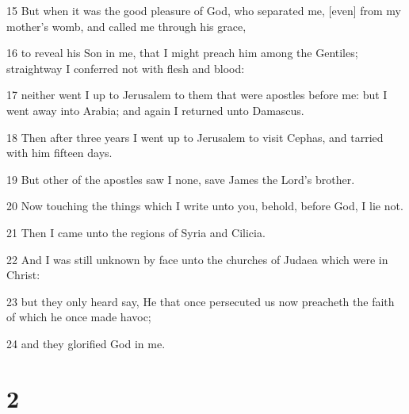 \par 15 But when it was the good pleasure of God, who separated me, [even] from my mother's womb, and called me through his grace,
\par 16 to reveal his Son in me, that I might preach him among the Gentiles; straightway I conferred not with flesh and blood:
\par 17 neither went I up to Jerusalem to them that were apostles before me: but I went away into Arabia; and again I returned unto Damascus.
\par 18 Then after three years I went up to Jerusalem to visit Cephas, and tarried with him fifteen days.
\par 19 But other of the apostles saw I none, save James the Lord's brother.
\par 20 Now touching the things which I write unto you, behold, before God, I lie not.
\par 21 Then I came unto the regions of Syria and Cilicia.
\par 22 And I was still unknown by face unto the churches of Judaea which were in Christ:
\par 23 but they only heard say, He that once persecuted us now preacheth the faith of which he once made havoc;
\par 24 and they glorified God in me.

\chapter{2}

